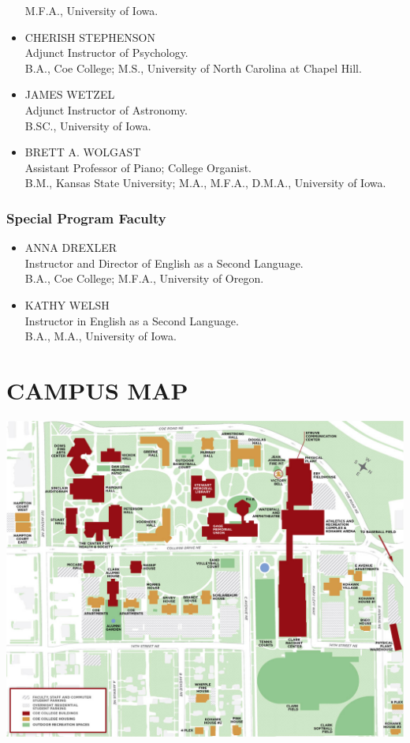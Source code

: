 \documentclass[
  letterpaper,
]{scrbook}
\begin{document}
\begin{itemize}
  M.F.A., University of Iowa.
\item
  CHERISH STEPHENSON\\
  Adjunct Instructor of Psychology.\\
  B.A., Coe College; M.S., University of North Carolina at Chapel Hill.
\item
  JAMES WETZEL\\
  Adjunct Instructor of Astronomy.\\
  B.SC., University of Iowa.
\item
  BRETT A. WOLGAST\\
  Assistant Professor of Piano; College Organist.\\
  B.M., Kansas State University; M.A., M.F.A., D.M.A., University of
  Iowa.
\end{itemize}

\subsection{Special Program Faculty}\label{special-program-faculty}

\begin{itemize}
\item
  ANNA DREXLER\\
  Instructor and Director of English as a Second Language.\\
  B.A., Coe College; M.F.A., University of Oregon.
\item
  KATHY WELSH\\
  Instructor in English as a Second Language.\\
  B.A., M.A., University of Iowa.
\end{itemize}

\chapter{CAMPUS MAP}\label{sec-campus-map}

\begin{center}
\includegraphics{catalog_sections/graphics/Campus-Map_full-screen.jpg}
\end{center}

\backmatter
\printindex
\end{document}
